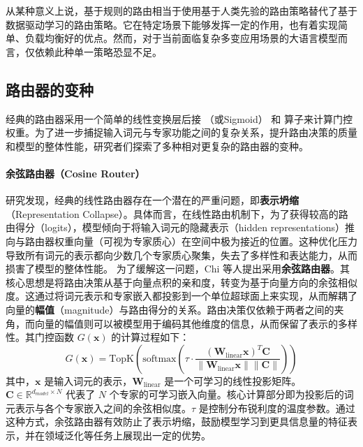 从某种意义上说，基于规则的路由相当于使用基于人类先验的路由策略替代了基于数据驱动学习的路由策略。它在特定场景下能够发挥一定的作用，也有着实现简单、负载均衡好的优点。然而，对于当前面临复杂多变应用场景的大语言模型而言，仅依赖此种单一策略恐显不足。

\subsection{路由器的变种}
经典的路由器采用一个简单的线性变换层后接 （或Sigmoid） 和  算子来计算门控权重。为了进一步捕捉输入词元与专家功能之间的复杂关系，提升路由决策的质量和模型的整体性能，研究者们探索了多种相对更复杂的路由器的变种。

\paragraph{余弦路由器（Cosine Router）}
研究发现，经典的线性路由器存在一个潜在的严重问题，即\textbf{表示坍缩}（Representation Collapse）\cite{Chi2022OnTR}。具体而言，在线性路由机制下，为了获得较高的路由得分（logits），模型倾向于将输入词元的隐藏表示（hidden representations）推向与路由器权重向量（可视为专家质心）在空间中极为接近的位置。这种优化压力导致所有词元的表示都向少数几个专家质心聚集，失去了多样性和表达能力，从而损害了模型的整体性能。
为了缓解这一问题，Chi 等人提出采用\textbf{余弦路由器}。其核心思想是将路由决策从基于向量点积的亲和度，转变为基于向量方向的余弦相似度。这通过将词元表示和专家嵌入都投影到一个单位超球面上来实现，从而解耦了向量的\textbf{幅值}（magnitude）与路由得分的关系。路由决策仅依赖于两者之间的夹角，而向量的幅值则可以被模型用于编码其他维度的信息，从而保留了表示的多样性。其门控函数 $G(\mathbf{x})$ 的计算过程如下：
\begin{equation}
G(\mathbf{x}) = \text{TopK} \left( \text{softmax} \left( \tau \cdot \frac{(\mathbf{W}_{\text{linear}}\mathbf{x})^T \mathbf{C}}{\|\mathbf{W}_{\text{linear}}\mathbf{x}\| \|\mathbf{C}\|} \right) \right)
\end{equation}
其中，$\mathbf{x}$ 是输入词元的表示，$\mathbf{W}_{\text{linear}}$ 是一个可学习的线性投影矩阵。$\mathbf{C} \in \mathbb{R}^{d_{model} \times N}$ 代表了 $N$ 个专家的可学习嵌入向量。核心计算部分即为投影后的词元表示与各个专家嵌入之间的余弦相似度。$\tau$ 是控制分布锐利度的温度参数。通过这种方式，余弦路由器有效防止了表示坍缩，鼓励模型学习到更具信息量的特征表示，并在领域泛化等任务上展现出一定的优势。

